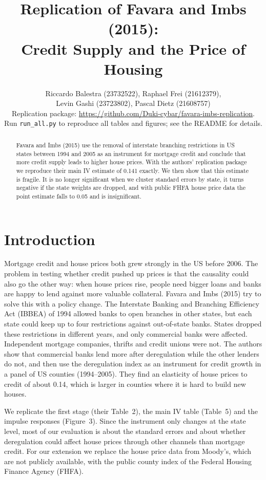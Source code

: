 \documentclass[12pt,a4paper]{article}
\title{Replication of Favara and Imbs (2015):\\{} Credit Supply and the Price of Housing}
\author{%
  Riccardo Balestra (23732522), Raphael Frei (21612379),\\
  Levin Gashi (23723802), Pascal Dietz (21608757)\\[0.4em]
  \small Replication package: \url{https://github.com/Duki-cybar/favara-imbs-replication}.\\
  \small Run \texttt{run\_all.py} to reproduce all tables and figures; see the README for details.%
}
\date{}
\begin{document}
\maketitle

\begin{abstract}
Favara and Imbs (2015) use the removal of interstate branching restrictions in US states between 1994 and 2005 as an instrument for mortgage credit and conclude that more credit supply leads to higher house prices. With the authors' replication package we reproduce their main IV estimate of 0.141 exactly. We then show that this estimate is fragile. It is no longer significant when we cluster standard errors by state, it turns negative if the state weights are dropped, and with public FHFA house price data the point estimate falls to 0.05 and is insignificant.
\end{abstract}

\section{Introduction}

Mortgage credit and house prices both grew strongly in the US before 2006. The problem in testing whether credit pushed up prices is that the causality could also go the other way: when house prices rise, people need bigger loans and banks are happy to lend against more valuable collateral. Favara and Imbs (2015) try to solve this with a policy change. The Interstate Banking and Branching Efficiency Act (IBBEA) of 1994 allowed banks to open branches in other states, but each state could keep up to four restrictions against out-of-state banks. States dropped these restrictions in different years, and only commercial banks were affected. Independent mortgage companies, thrifts and credit unions were not. The authors show that commercial banks lend more after deregulation while the other lenders do not, and then use the deregulation index as an instrument for credit growth in a panel of US counties (1994--2005). They find an elasticity of house prices to credit of about 0.14, which is larger in counties where it is hard to build new houses.

We replicate the first stage (their Table~2), the main IV table (Table~5) and the impulse responses (Figure~3). Since the instrument only changes at the state level, most of our evaluation is about the standard errors and about whether deregulation could affect house prices through other channels than mortgage credit. For our extension we replace the house price data from Moody's, which are not publicly available, with the public county index of the Federal Housing Finance Agency (FHFA).
\end{document}
